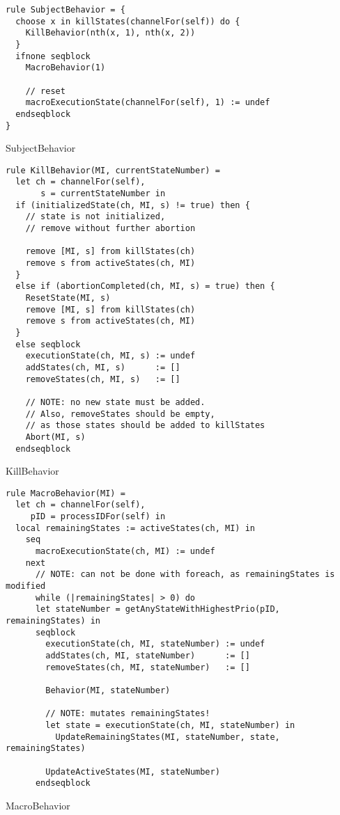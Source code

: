 \begin{listing}[H]
\begin{verbatim}
rule SubjectBehavior = {
  choose x in killStates(channelFor(self)) do {
    KillBehavior(nth(x, 1), nth(x, 2))
  }
  ifnone seqblock
    MacroBehavior(1)

    // reset
    macroExecutionState(channelFor(self), 1) := undef
  endseqblock
}
\end{verbatim}
\caption{SubjectBehavior}
\label{lst:asm:SubjectBehavior}
\end{listing}




\begin{listing}[H]
\begin{verbatim}
rule KillBehavior(MI, currentStateNumber) =
  let ch = channelFor(self),
       s = currentStateNumber in
  if (initializedState(ch, MI, s) != true) then {
    // state is not initialized,
    // remove without further abortion

    remove [MI, s] from killStates(ch)
    remove s from activeStates(ch, MI)
  }
  else if (abortionCompleted(ch, MI, s) = true) then {
    ResetState(MI, s)
    remove [MI, s] from killStates(ch)
    remove s from activeStates(ch, MI)
  }
  else seqblock
    executionState(ch, MI, s) := undef
    addStates(ch, MI, s)      := []
    removeStates(ch, MI, s)   := []

    // NOTE: no new state must be added.
    // Also, removeStates should be empty,
    // as those states should be added to killStates
    Abort(MI, s)
  endseqblock
\end{verbatim}
\caption{KillBehavior}
\label{lst:asm:KillBehavior}
\end{listing}




\begin{listing}[H]
\begin{verbatim}
rule MacroBehavior(MI) =
  let ch = channelFor(self),
     pID = processIDFor(self) in
  local remainingStates := activeStates(ch, MI) in
    seq
      macroExecutionState(ch, MI) := undef
    next
      // NOTE: can not be done with foreach, as remainingStates is modified
      while (|remainingStates| > 0) do
      let stateNumber = getAnyStateWithHighestPrio(pID, remainingStates) in
      seqblock
        executionState(ch, MI, stateNumber) := undef
        addStates(ch, MI, stateNumber)      := []
        removeStates(ch, MI, stateNumber)   := []

        Behavior(MI, stateNumber)

        // NOTE: mutates remainingStates!
        let state = executionState(ch, MI, stateNumber) in
          UpdateRemainingStates(MI, stateNumber, state, remainingStates)

        UpdateActiveStates(MI, stateNumber)
      endseqblock
\end{verbatim}
\caption{MacroBehavior}
\label{lst:asm:MacroBehavior}
\end{listing}




